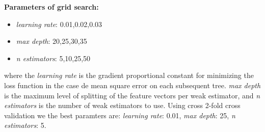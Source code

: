 \textbf{Parameters of grid search:}

\begin{itemize}
	\item \emph{learning rate}: 0.01,0.02,0.03
	\item \emph{max depth}:  20,25,30,35 
	\item \emph{n estimators}: 5,10,25,50
\end{itemize}


where the  \emph{learning rate} is the gradient proportional constant for minimizing the loss function in the case de mean square error on each subsequent tree. \emph{max depth} is the maximum level of splitting of the feature vectors per weak estimator, and \emph{n estimators} is the number of weak estimators to use. Using cross 2-fold cross validation we the best paramters are: \emph{learning rate}: 0.01, \emph{max depth}: 25, \emph{n estimators}: 5.



